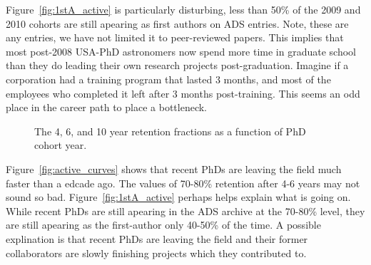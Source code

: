 \documentclass{emulateapj}
\begin{document}
\begin{figure*}
  \caption{Plot of how long PhD astronomers stay active in the ADS archive.  Error bars are set by comparing to a subset of astronomers with more unique names as outlined in \S\ref{sec:db_construct}.   \label{fig:active_curves}}
  \end{figure*}


\begin{figure*}
  \caption{Like Figure~\ref{fig:active_curves}, but now using the most recent connected paper where the author is the first author.  The dashed lines show the curves from Figure~\ref{fig:active_curves} for comparison. The downturn in the older curves (1999-2004) could be an artifact caused by astronomers who lead a paper only every few years, e.g., two years from now those curves could rise back up.  \label{fig:1stA_active}}
\end{figure*}


Figure~\ref{fig:1stA_active} is particularly disturbing, less than 50\% of the 2009 and 2010 cohorts are still apearing as first authors on ADS entries. Note, these are any entries, we have not limited it to peer-reviewed papers.  This implies that most post-2008 USA-PhD astronomers now spend more time in graduate school than they do leading their own research projects post-graduation. Imagine if a corporation had a training program that lasted 3 months, and most of the employees who completed it left after 3 months post-training.  This seems an odd place in the career path to place a bottleneck.




\begin{figure}
  \caption{The 4, 6, and 10 year retention fractions as a function of PhD cohort year.\label{fig:retention}}
\end{figure}

Figure~\ref{fig:active_curves} shows that recent PhDs are leaving the field much faster than a edcade ago.  The values of 70-80\% retention after 4-6 years may not sound so bad.  Figure~\ref{fig:1stA_active} perhaps helps explain what is going on. While recent PhDs are still apearing in the ADS archive at the 70-80\% level, they are still apearing as the first-author only 40-50\% of the time. A possible explination is that recent PhDs are leaving the field and their former collaborators are slowly finishing projects which they contributed to.
\end{document}
